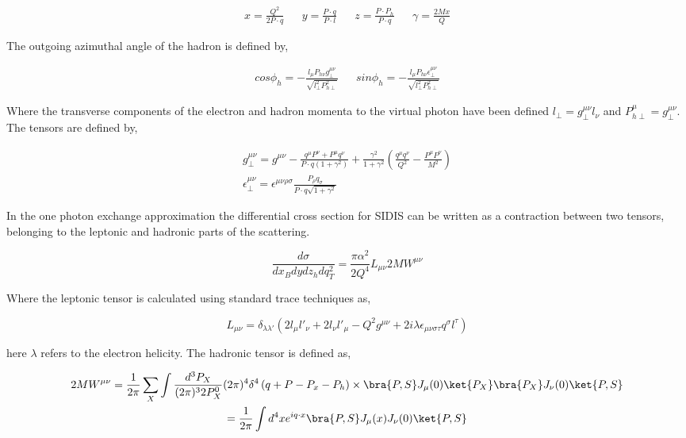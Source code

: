 \begin{align}
  x = \frac{Q^{2}}{2P \cdot q} && y = \frac{P \cdot q}{P \cdot l} && z = \frac{P \cdot P_{h}}{P \cdot q} && \gamma = \frac{2Mx}{Q}
\end{align}

The outgoing azimuthal angle of the hadron is defined by,

\begin{align}
  cos\phi_h = -\frac{l_\mu P_{h\nu} g^{\mu \nu}_{\perp}}{\sqrt{l^{2}_{\perp} P^{2}_{h\perp}}} &&
  sin\phi_h = -\frac{l_\mu P_{h\nu} \epsilon^{\mu \nu}_{\perp}}{\sqrt{l^{2}_{\perp} P^{2}_{h\perp}}} 
\end{align}

Where the transverse components of the electron and hadron momenta to the virtual photon have been defined $l_{\perp} = g^{\mu \nu}_{\perp} l_{\nu}$ and $P^{\mu}_{h\perp} = g^{\mu \nu}_{\perp}$.  The tensors are defined by,

\begin{gather}
  g^{\mu \nu}_{\perp} = g^{\mu \nu} - \frac{q^\mu P^\nu + P^\mu q^\nu}{P \cdot q (1 + \gamma^2)} + \frac{\gamma^{2}}{1 + \gamma^2} \left( \frac{q^\mu q^\nu}{Q^2} - \frac{P^\mu P^\nu}{M^2}\right) \\
  \epsilon^{\mu \nu}_{\perp} = \epsilon^{\mu \nu \rho \sigma} \frac{P_\rho q_\sigma}{P \cdot q \sqrt{1 + \gamma^2}}
\end{gather}
 
In the one photon exchange approximation the differential cross section for SIDIS can be written as a contraction between two tensors, belonging to the leptonic and hadronic parts of the scattering.

\begin{equation}
  \frac{d\sigma}{dx_{B} dy dz_{h} dq_{T}^{2}} = \frac{\pi \alpha^{2}}{2 Q^{4}} L_{\mu \nu} 2M W^{\mu \nu}
\end{equation}

Where the leptonic tensor is calculated using standard trace techniques as,

\begin{equation}
  L_{\mu \nu} = \delta_{\lambda \lambda'} \left( 2 l_{\mu} l'_{\nu} + 2 l_{\nu} l'_{\mu} - Q^{2} g^{\mu \nu} + 2i\lambda \epsilon_{\mu \nu \sigma \tau} q^{\sigma} l^{\tau} \right) 
\end{equation}

here $\lambda$ refers to the electron helicity. The hadronic tensor is defined as,

\begin{gather}
  2MW^{\mu \nu} = \frac{1}{2\pi} \sum_{X} \int \frac{d^{3}P_{X}}{(2\pi)^{3}2P^{0}_{X}} (2\pi)^{4} \delta^{4} \left( q + P - P_{x} - P_{h} \right) \times
  \bra{P,S} J_{\mu}(0) \ket{P_{X}} \bra{P_{X}} J_{\nu}(0) \ket{P,S} \nonumber \\
  = \frac{1}{2\pi} \int d^{4}x e^{iq\cdot x} \bra{P,S} J_{\mu}(x) J_{\nu}(0) \ket{P,S}
  \label{eqn:hadronictensor}
\end{gather}

